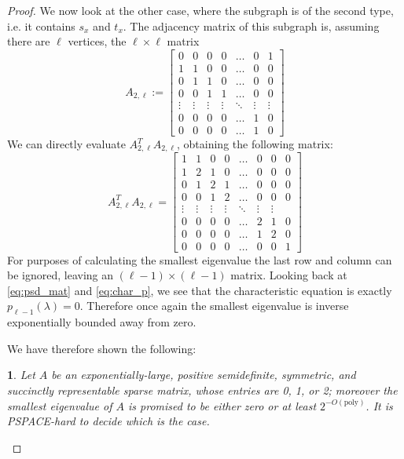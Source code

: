 \documentclass[english]{article}
\numberwithin{equation}{section}
\numberwithin{figure}{section}
\theoremstyle{plain}
\theoremstyle{definition}
\theoremstyle{plain}
\newtheorem{lem}[thm]{\protect\lemmaname}
\theoremstyle{definition}
\theoremstyle{remark}
\theoremstyle{remark}
\theoremstyle{plain}
\providecommand{\lemmaname}{Lemma}
\begin{document}
\begin{proof}
We now look at the other case, where the subgraph is of the second type, i.e. it contains $s_x$ and $t_x$. The adjacency matrix of this subgraph is, assuming there are $\ell$ vertices, the $\ell \times \ell $ matrix
\begin{equation}
A_{2,\ell} := 
\begin{bmatrix}
    0 & 0 & 0 & 0 & \dots  & 0  & 1 \\
    1 & 1 & 0 & 0 &\dots  & 0 & 0 \\
    0 & 1 & 1 & 0 & \dots  & 0 & 0 \\
     0 & 0 & 1 & 1 & \dots  & 0 & 0 \\
    \vdots & \vdots & \vdots & \vdots & \ddots & \vdots & \vdots \\
    0 & 0 & 0 & 0 & \dots  & 1 & 0 \\
    0 & 0 & 0 & 0 & \dots  & 1 & 0
\end{bmatrix}
\end{equation}
We can directly evaluate $A_{2,\ell}^T A_{2,\ell}$, obtaining the following matrix:
\begin{equation}
A_{2,\ell}^T A_{2,\ell} = 
\begin{bmatrix}
    1 & 1 & 0 & 0 & \dots  & 0 & 0  & 0 \\
    1 & 2 & 1 & 0 &\dots  & 0 & 0 & 0 \\
    0 & 1 & 2 & 1 & \dots  & 0 & 0 & 0 \\
     0 & 0 & 1 & 2 & \dots  & 0 & 0 & 0 \\
    \vdots & \vdots & \vdots & \vdots & \ddots & \vdots & \vdots \\
    0 & 0 & 0 & 0 & \dots  & 2 & 1 & 0 \\
    0 & 0 & 0 & 0 & \dots  & 1 & 2 & 0 \\
    0 & 0 & 0 & 0 & \dots  & 0 & 0 & 1
\end{bmatrix}
\end{equation}
For purposes of calculating the smallest eigenvalue the last row and column can be ignored, leaving an $(\ell-1) \times (\ell-1)$ matrix. Looking back at \ref{eq:psd_mat} and \ref{eq:char_p}, we see that the characteristic equation is exactly $p_{\ell-1}(\lambda) = 0$. Therefore once again the smallest eigenvalue is inverse exponentially bounded away from zero.

We have therefore shown the following:
\begin{lem}
Let $A$ be an exponentially-large, positive semidefinite, symmetric, and succinctly representable sparse matrix, whose entries are 0, 1, or 2; moreover the smallest eigenvalue of $A$ is promised to be either zero or at least $2^{-O(\text{poly})}$. It is PSPACE-hard to decide which is the case.
\end{lem}


\end{proof}
\end{document}

